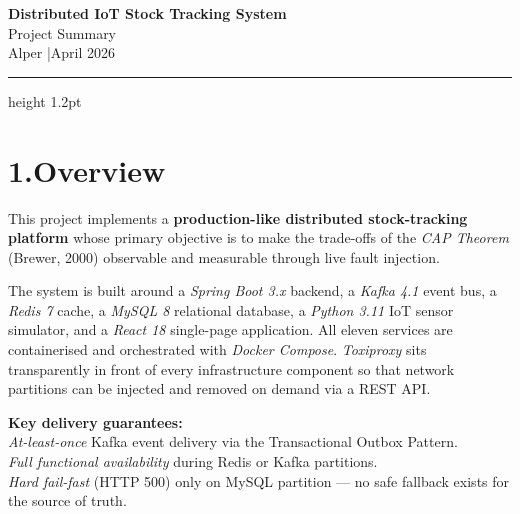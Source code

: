 \documentclass[11pt,a4paper]{article}
\newcommand{\tech}[1]{\textit{#1}}
\begin{document}
\begin{center}
  {\LARGE\bfseries\color{primary}
    Distributed IoT Stock Tracking System}\\[0.5em]
  {\large\color{secondary}
    Project Summary}\\[0.3em]
  {\normalsize Alper \quad|\quad April 2026}
  \vspace{0.4em}
  \hrule height 1.2pt
\end{center}

\vspace{0.4em}

\section*{1.\quad Overview}

This project implements a \textbf{production-like distributed stock-tracking
platform} whose primary objective is to make the trade-offs of the
\emph{CAP Theorem} (Brewer, 2000) observable and measurable through live
fault injection.

The system is built around a \tech{Spring Boot 3.x} backend, a
\tech{Kafka 4.1} event bus, a \tech{Redis 7} cache, a \tech{MySQL 8}
relational database, a \tech{Python 3.11} IoT sensor simulator, and a
\tech{React 18} single-page application.
All eleven services are containerised and orchestrated with
\tech{Docker Compose}.
\tech{Toxiproxy} sits transparently in front of every infrastructure
component so that network partitions can be injected and removed on demand
via a REST API.

\vspace{0.3em}

\begin{mdframed}[backgroundcolor=primary!5, linecolor=primary!40, linewidth=0.8pt]
\small
\textbf{Key delivery guarantees:}\\
\textbullet\; \emph{At-least-once} Kafka event delivery via the Transactional Outbox Pattern.\\
\textbullet\; \emph{Full functional availability} during Redis or Kafka partitions.\\
\textbullet\; \emph{Hard fail-fast} (HTTP 500) only on MySQL partition --- no
              safe fallback exists for the source of truth.
\end{mdframed}

\end{document}
